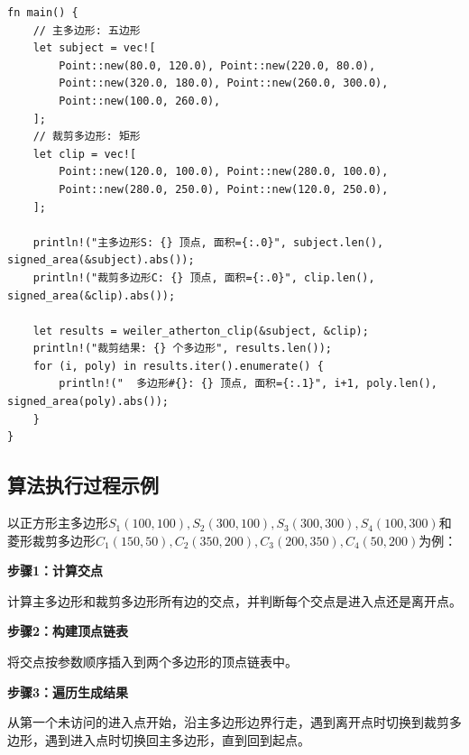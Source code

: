 \documentclass[12pt,a4paper]{article}
\begin{document}
\begin{lstlisting}
fn main() {
    // 主多边形: 五边形
    let subject = vec![
        Point::new(80.0, 120.0), Point::new(220.0, 80.0),
        Point::new(320.0, 180.0), Point::new(260.0, 300.0),
        Point::new(100.0, 260.0),
    ];
    // 裁剪多边形: 矩形
    let clip = vec![
        Point::new(120.0, 100.0), Point::new(280.0, 100.0),
        Point::new(280.0, 250.0), Point::new(120.0, 250.0),
    ];

    println!("主多边形S: {} 顶点, 面积={:.0}", subject.len(), signed_area(&subject).abs());
    println!("裁剪多边形C: {} 顶点, 面积={:.0}", clip.len(), signed_area(&clip).abs());

    let results = weiler_atherton_clip(&subject, &clip);
    println!("裁剪结果: {} 个多边形", results.len());
    for (i, poly) in results.iter().enumerate() {
        println!("  多边形#{}: {} 顶点, 面积={:.1}", i+1, poly.len(), signed_area(poly).abs());
    }
}
\end{lstlisting}

\subsection{算法执行过程示例}

以正方形主多边形$S_1(100,100), S_2(300,100), S_3(300,300), S_4(100,300)$和菱形裁剪多边形$C_1(150,50), C_2(350,200), C_3(200,350), C_4(50,200)$为例：

\textbf{步骤1：计算交点}

计算主多边形和裁剪多边形所有边的交点，并判断每个交点是进入点还是离开点。

\textbf{步骤2：构建顶点链表}

将交点按参数顺序插入到两个多边形的顶点链表中。

\textbf{步骤3：遍历生成结果}

从第一个未访问的进入点开始，沿主多边形边界行走，遇到离开点时切换到裁剪多边形，遇到进入点时切换回主多边形，直到回到起点。
\end{document}
